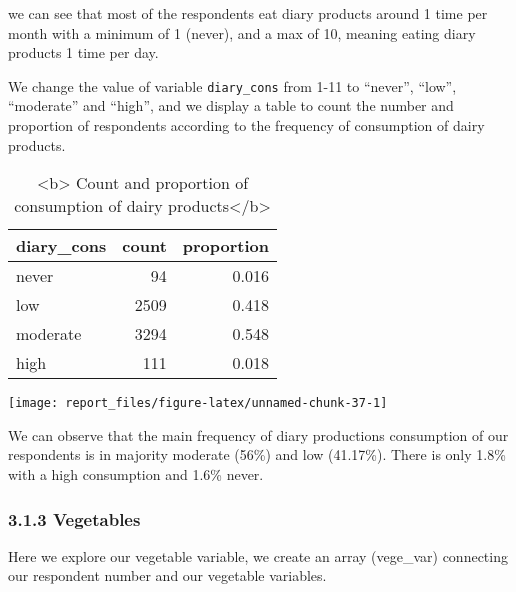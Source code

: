 \documentclass[
]{article}
\begin{document}
we can see that most of the respondents eat diary products around 1 time
per month with a minimum of 1 (never), and a max of 10, meaning eating
diary products 1 time per day.

We change the value of variable \texttt{diary\_cons} from 1-11 to
``never'', ``low'', ``moderate'' and ``high'', and we display a table to
count the number and proportion of respondents according to the
frequency of consumption of dairy products.

\begin{table}

\caption{\label{tab:unnamed-chunk-37}<b> Count and proportion of consumption of dairy products</b>}
\centering
\begin{tabular}[t]{l|r|r}
\hline
diary\_cons & count & proportion\\
\hline
never & 94 & 0.016\\
\hline
low & 2509 & 0.418\\
\hline
moderate & 3294 & 0.548\\
\hline
high & 111 & 0.018\\
\hline
\end{tabular}
\end{table}

\begin{center}\texttt{[image: report\_files/figure-latex/unnamed-chunk-37-1]} \end{center}

We can observe that the main frequency of diary productions consumption
of our respondents is in majority moderate (56\%) and low (41.17\%).
There is only 1.8\% with a high consumption and 1.6\% never.

\hypertarget{vegetables}{%
\subsubsection{3.1.3 Vegetables}\label{vegetables}}

Here we explore our vegetable variable, we create an array (vege\_var)
connecting our respondent number and our vegetable variables.
\end{document}
